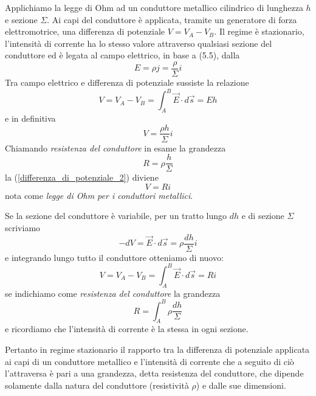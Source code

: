\documentclass[class=book, crop=false, oneside, 12pt]{standalone}
\begin{document}
Applichiamo la legge di Ohm ad un conduttore metallico cilindrico di lunghezza \(h\) e sezione \(\Sigma\). 
Ai capi del conduttore è applicata, tramite un generatore di forza elettromotrice, una differenza di potenziale \(V = V_A - V_B\).
Il regime è stazionario, l'intensità di corrente ha lo stesso valore attraverso qualsiasi sezione del conduttore ed è legata al campo elettrico, in base a (5.5), dalla
\begin{equation*}
    E = \rho j = \frac{\rho}{\Sigma} i
\end{equation*}
Tra campo elettrico e differenza di potenziale sussiste la relazione 
\begin{equation*} 
    V = V_A - V_B = \int_A^B \overrightarrow{E} \cdot d \overrightarrow{s} = E h
\end{equation*}
e in definitiva 
\begin{equation}
    V = \frac{\rho h}{\Sigma} i
\end{equation} \label{differenza_di_potenziale_2}
Chiamando \emph{resistenza del conduttore} in esame la grandezza
\begin{equation}
    R = \rho \frac{h}{\Sigma}
\end{equation}
la (\ref{differenza_di_potenziale_2}) diviene
\begin{equation} \label{legge_di_ohm_2}
    V = R i
\end{equation}
nota come \emph{legge di Ohm per i conduttori metallici}.

Se la sezione del conduttore è variabile, per un tratto lungo \(dh\) e di sezione \(\Sigma\) scriviamo 
\begin{equation*}
    -d V = \overrightarrow{E} \cdot d \overrightarrow{s} = \rho \frac{dh}{\Sigma} i 
\end{equation*}
e integrando lungo tutto il conduttore otteniamo di nuovo:
\begin{equation*}
    V = V_A - V_B = \int_A^B \overrightarrow{E} \cdot d \overrightarrow{s} = R i
\end{equation*}
se indichiamo come \emph{resistenza del conduttore} la grandezza
\begin{equation}
    R = \int_A^B \rho \frac{dh }{\Sigma}
\end{equation}
e ricordiamo che l'intensità di corrente è la stessa in ogni sezione. 

Pertanto in regime stazionario il rapporto tra la differenza di potenziale applicata ai capi di un conduttore metallico e l'intensità di corrente che a seguito di ciò l'attraversa è pari a una grandezza, detta resistenza del conduttore, che dipende solamente dalla natura del conduttore (resistività \(\rho\)) e dalle sue dimensioni.
\end{document}
